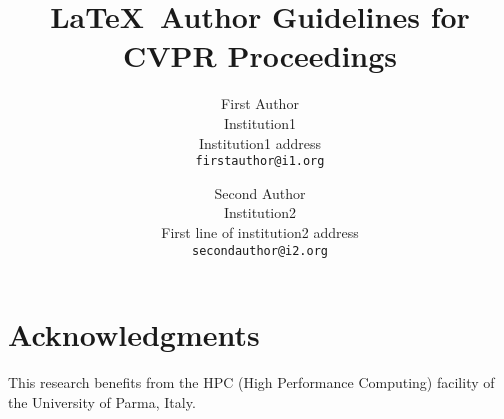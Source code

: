 \documentclass[review]{cvpr}
\begin{document}
\title{\LaTeX\ Author Guidelines for CVPR Proceedings}

\author{First Author\\
Institution1\\
Institution1 address\\
{\tt\small firstauthor@i1.org}
\and
Second Author\\
Institution2\\
First line of institution2 address\\
{\tt\small secondauthor@i2.org}
}

\maketitle


\begin{abstract}

\end{abstract}







\section*{Acknowledgments}
\noindent This research benefits from the HPC (High Performance Computing) facility of the University of Parma, Italy.

{\small


}
\end{document}
